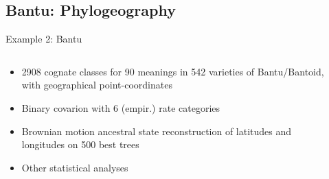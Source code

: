 \documentclass[9pt]{beamer}
\begin{document}
\subsection{Bantu: Phylogeography}
\begin{frame}{Example 2: Bantu}
  \begin{columns}
    \begin{column}{0.5\textwidth}
      \begin{itemize}
      \item 2908 cognate classes for 90 meanings in 542 varieties of Bantu/Bantoid,
        with geographical point-coordinates
      \item Binary covarion with 6 (empir.) rate categories
      \item Brownian motion ancestral state reconstruction of
        latitudes and longitudes on 500 best trees
      \item Other statistical analyses
      \end{itemize}
    \end{column}
    \begin{column}{0.5\textwidth}
    \end{column}
  \end{columns}
\end{frame}
\end{document}
